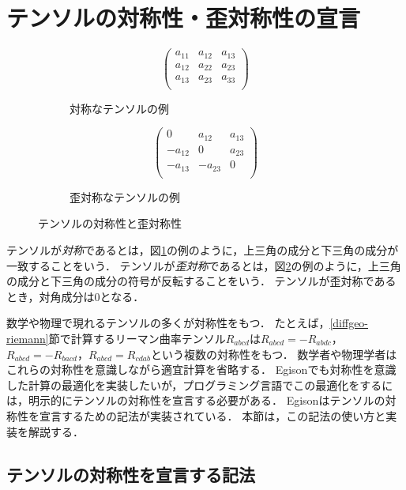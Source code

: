 \section{テンソルの対称性・歪対称性の宣言}\label{tensor-symm}

\begin{figure}[t]
 \begin{subfigure}[b]{1.0\linewidth}
$$
\begin{pmatrix}
a_{11} & a_{12} & a_{13} \\
a_{12} & a_{22} & a_{23} \\
a_{13} & a_{23} & a_{33} \\
\end{pmatrix}
$$
  \caption{対称なテンソルの例}
  \label{fig:symmtensor}
 \end{subfigure}
  \medskip
 \begin{subfigure}[b]{1.0\linewidth}
$$
\begin{pmatrix}
0 & a_{12} & a_{13} \\
-a_{12} & 0 & a_{23} \\
-a_{13} & -a_{23} & 0 \\
\end{pmatrix}
$$
  \caption{歪対称なテンソルの例}
  \label{fig:antisymmtensor}
 \end{subfigure}
 \caption{テンソルの対称性と歪対称性}
 \label{fig:symm}
\end{figure}


テンソルが\emph{対称}であるとは，図\ref{fig:symmtensor}の例のように，上三角の成分と下三角の成分が一致することをいう．
テンソルが\emph{歪対称}であるとは，図\ref{fig:antisymmtensor}の例のように，上三角の成分と下三角の成分の符号が反転することをいう．
テンソルが歪対称であるとき，対角成分は0となる．

数学や物理で現れるテンソルの多くが対称性をもつ．
たとえば，\ref{diffgeo-riemann}節で計算するリーマン曲率テンソル$R_{abcd}$は$R_{abcd} = -R_{abdc}$，$R_{abcd} = -R_{bacd}$，$R_{abcd} = R_{cdab}$という複数の対称性をもつ．
数学者や物理学者はこれらの対称性を意識しながら適宜計算を省略する．
Egisonでも対称性を意識した計算の最適化を実装したいが，プログラミング言語でこの最適化をするには，明示的にテンソルの対称性を宣言する必要がある．
Egisonはテンソルの対称性を宣言するための記法が実装されている．
本節は，この記法の使い方と実装を解説する．

\subsection{テンソルの対称性を宣言する記法}


